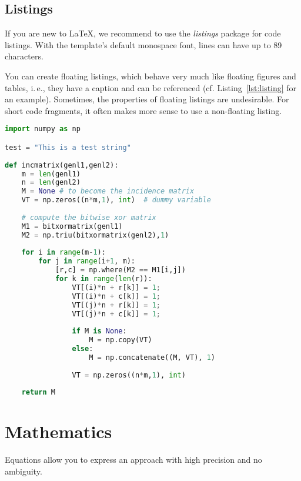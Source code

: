\subsection{Listings}

If you are new to LaTeX, we recommend to use the \emph{listings} package for code listings. With the template's default monospace font, lines can have up to 89 characters.

You can create floating listings, which behave very much like floating figures and tables, i.\,e., they have a caption and can be referenced (cf. Listing~\ref{lst:listing} for an example). Sometimes, the properties of floating listings are undesirable. For short code fragments, it often makes more sense to use a non-floating listing.

\begin{lstlisting}[language=Python,float=t,
  caption={This is an example of syntax highlighting of
  Python code with a relatively long caption},label={lst:listing}]
import numpy as np

test = "This is a test string"
 
def incmatrix(genl1,genl2):
    m = len(genl1)
    n = len(genl2)
    M = None # to become the incidence matrix
    VT = np.zeros((n*m,1), int)  # dummy variable
 
    # compute the bitwise xor matrix
    M1 = bitxormatrix(genl1)
    M2 = np.triu(bitxormatrix(genl2),1) 
 
    for i in range(m-1):
        for j in range(i+1, m):
            [r,c] = np.where(M2 == M1[i,j])
            for k in range(len(r)):
                VT[(i)*n + r[k]] = 1;
                VT[(i)*n + c[k]] = 1;
                VT[(j)*n + r[k]] = 1;
                VT[(j)*n + c[k]] = 1;
 
                if M is None:
                    M = np.copy(VT)
                else:
                    M = np.concatenate((M, VT), 1)
 
                VT = np.zeros((n*m,1), int)
 
    return M
\end{lstlisting}


\section{Mathematics}

Equations allow you to express an approach with high precision and no ambiguity. 

